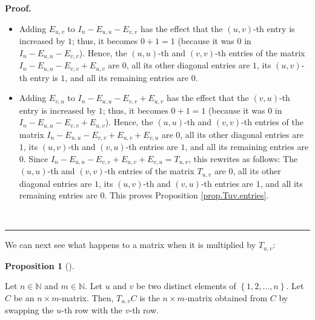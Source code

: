 \documentclass[numbers=enddot,12pt,final,onecolumn,notitlepage]{scrartcl}%
\theoremstyle{definition}
\newtheorem{prop}[theo]{Proposition}
\newenvironment{proposition}[1][]
{\begin{prop}[#1]\begin{leftbar}}
{\end{leftbar}\end{prop}}
\newenvironment{proof}[1][Proof]{\noindent\textbf{#1.} }{\ \rule{0.5em}{0.5em}}
\begin{document}
\begin{proof}
\begin{itemize}
\item Adding $E_{u,v}$ to $I_{n}-E_{u,u}-E_{v,v}$ has the effect that the
$\left(  u,v\right)  $-th entry is increased by $1$; thus, it becomes $0+1=1$
(because it was $0$ in $I_{n}-E_{u,u}-E_{v,v}$). Hence, the $\left(
u,u\right)  $-th and $\left(  v,v\right)  $-th entries of the matrix
$I_{n}-E_{u,u}-E_{v,v}+E_{u,v}$ are $0$, all its other diagonal entries are
$1$, its $\left(  u,v\right)  $-th entry is $1$, and all its remaining entries
are $0$.

\item Adding $E_{v,u}$ to $I_{n}-E_{u,u}-E_{v,v}+E_{u,v}$ has the effect that
the $\left(  v,u\right)  $-th entry is increased by $1$; thus, it becomes
$0+1=1$ (because it was $0$ in $I_{n}-E_{u,u}-E_{v,v}+E_{u,v}$). Hence, the
$\left(  u,u\right)  $-th and $\left(  v,v\right)  $-th entries of the matrix
$I_{n}-E_{u,u}-E_{v,v}+E_{u,v}+E_{v,u}$ are $0$, all its other diagonal
entries are $1$, its $\left(  u,v\right)  $-th and $\left(  v,u\right)  $-th
entries are $1$, and all its remaining entries are $0$. Since $I_{n}%
-E_{u,u}-E_{v,v}+E_{u,v}+E_{v,u}=T_{u,v}$, this rewrites as follows: The
$\left(  u,u\right)  $-th and $\left(  v,v\right)  $-th entries of the matrix
$T_{u,v}$ are $0$, all its other diagonal entries are $1$, its $\left(
u,v\right)  $-th and $\left(  v,u\right)  $-th entries are $1$, and all its
remaining entries are $0$. This proves Proposition \ref{prop.Tuv.entries}.
\end{itemize}
\end{proof}

We can next see what happens to a matrix when it is multiplied by $T_{u,v}$:

\begin{proposition}
\label{prop.Tuv.laction}Let $n\in\mathbb{N}$ and $m\in\mathbb{N}$. Let $u$ and
$v$ be two distinct elements of $\left\{  1,2,\ldots,n\right\}  $. Let $C$ be
an $n\times m$-matrix. Then, $T_{u,v}C$ is the $n\times m$-matrix obtained
from $C$ by swapping the $u$-th row with the $v$-th row.
\end{proposition}
\end{document}
